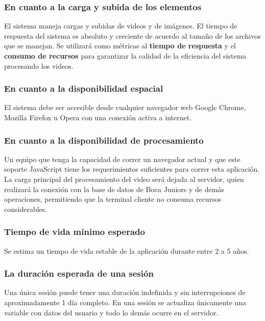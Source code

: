 \documentclass[a4paper]{article}
\begin{document}
{	\subsubsection{En cuanto a la carga y subida de los elementos}
    	El sistema maneja cargas y subidas de videos y de imágenes. \color{black}
        El tiempo de respuesta del sistema es absoluto y creciente de acuerdo al tamaño de los archivos que se manejan. Se utilizará como métricas al \textbf{tiempo de respuesta} y el \textbf{consumo de recursos} para garantizar la calidad de la eficiencia del sistema procesando los videos. 
        
    \subsubsection{En cuanto a la disponibilidad espacial}
     
    	El sistema debe ser accesible desde cualquier navegador web Google Chrome, Mozilla Firefox u Opera con una conexión activa a internet. 
        
    \subsubsection{En cuanto a la disponibilidad de procesamiento}
    	
        Un equipo que tenga la capacidad de correr un navegador actual y que este soporte JavaScript tiene los requerimientos suficientes para correr esta aplicación. La carga principal del procesamiento del video será dejada al servidor, quien realizará la conexión con la base de datos de Boca Juniors y de demás operaciones, permitiendo que la terminal cliente no consuma recursos considerables. 
    \subsubsection{Tiempo de vida mínimo esperado}
    	
        Se estima un tiempo de vida estable de la aplicación durante entre 2 a 5 años. 
        
    \subsubsection{La duración esperada de una sesión}
    	
        Una única sesión puede tener una duración indefinida y sin interrupciones de aproximadamente 1 día completo. En una sesión se actualiza únicamente una variable con datos del usuario y todo lo demás ocurre en el servidor.  \\ \\



}
\end{document}
